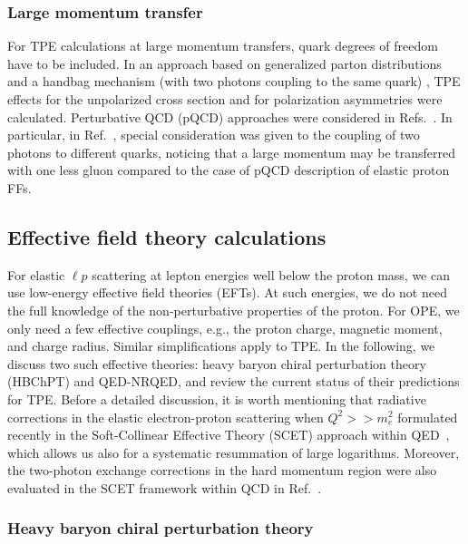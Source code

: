 \subsubsection{Large momentum transfer}

For TPE calculations at large momentum transfers, quark degrees of freedom have to be included. In an approach based on generalized parton distributions and a handbag mechanism (with two photons coupling to the same quark) \cite{Chen:2004tw,Afanasev:2005prd}, TPE effects for the unpolarized cross section and for polarization asymmetries were calculated. Perturbative QCD (pQCD) approaches were considered in Refs.~\cite{Borisyuk:2008db, Guttmann:2010au}. In particular, in Ref.~\cite{Guttmann:2010au}, special consideration was given to the coupling of two photons to different quarks, noticing that a large momentum may be transferred with one less gluon compared to the case of pQCD description of elastic proton FFs.


\subsection{Effective field theory calculations}

For elastic $\ell p$ scattering at lepton energies well below the proton mass, we can use low-energy effective field theories (EFTs). At such energies, we do not need the full knowledge of the non-perturbative properties of the proton. For OPE, we only need a few effective couplings, e.g., the proton charge, magnetic moment, and charge radius. Similar simplifications apply to TPE. In the following, we discuss two such effective theories: heavy baryon chiral perturbation theory (HBChPT) and QED-NRQED, and review the current status of their predictions for TPE.
Before a detailed discussion, it is worth mentioning that radiative corrections in the elastic electron-proton scattering when $Q^2 >> m^2_e$ formulated recently in the Soft-Collinear Effective Theory (SCET) approach within QED~\cite{Hill:2016gdf}, which allows us also for a systematic resummation of large logarithms. Moreover, the two-photon exchange corrections in the hard momentum region were also evaluated in the SCET framework within QCD in Ref.~\cite{Kivel:2012vs}.

\subsubsection{Heavy baryon chiral perturbation theory}

